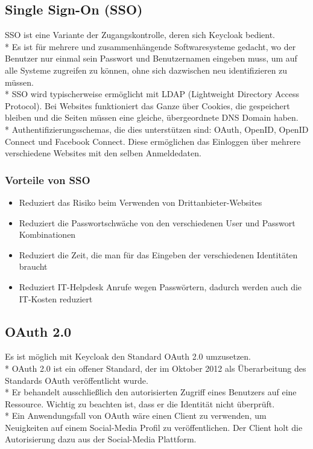 \subsection{Single Sign-On (SSO)}
\label{sec:SSO}
SSO ist eine Variante der Zugangskontrolle, deren sich Keycloak bedient. \\*
Es ist für mehrere und zusammenhängende Softwaresysteme gedacht, wo der Benutzer nur einmal sein Passwort und Benutzernamen eingeben muss, um auf alle Systeme zugreifen zu können,
ohne sich dazwischen neu identifizieren zu müssen.\\* SSO wird typischerweise ermöglicht mit LDAP (Lightweight Directory Access Protocol). Bei Websites funktioniert das Ganze über Cookies, die gespeichert bleiben 
und die Seiten müssen eine gleiche, übergeordnete DNS Domain haben.\\* 
Authentifizierungsschemas, die dies unterstützen sind: OAuth, OpenID, OpenID Connect und Facebook Connect. Diese ermöglichen das Einloggen über mehrere verschiedene Websites mit den selben Anmeldedaten.\cite{KeycloakMakeIT}
\subsubsection{Vorteile von SSO}
\begin{itemize}
    \item Reduziert das Risiko beim Verwenden von Drittanbieter-Websites
    \item Reduziert die Passwortschwäche von den verschiedenen User und Passwort Kombinationen
    \item Reduziert die Zeit, die man für das Eingeben der verschiedenen Identitäten braucht
    \item Reduziert IT-Helpdesk Anrufe wegen Passwörtern, dadurch werden auch die IT-Kosten reduziert \cite{KeycloakMakeIT}
\end{itemize}

\subsection{OAuth 2.0}
Es ist möglich mit Keycloak den Standard OAuth 2.0 umzusetzen. \\*
OAuth 2.0 ist ein offener Standard, der im Oktober 2012 als Überarbeitung des Standards OAuth veröffentlicht wurde. \\*
Er behandelt ausschließlich den autorisierten Zugriff eines Benutzers auf eine Ressource. Wichtig zu beachten ist, dass er die Identität nicht überprüft. \\*
Ein Anwendungsfall von OAuth wäre einen Client zu verwenden, um Neuigkeiten auf einem Social-Media Profil zu veröffentlichen. Der Client holt die Autorisierung dazu aus der Social-Media Plattform. \cite{OAuthIonos} \cite{KeycloakCodeCentric}
\pagebreak

